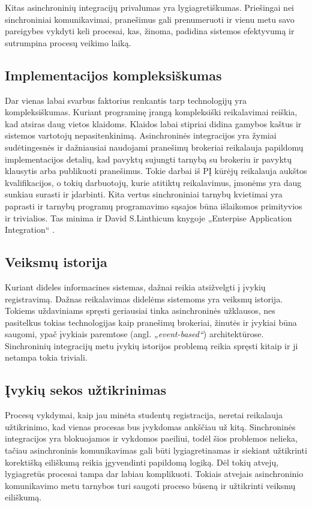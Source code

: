 Kitas asinchroninių integracijų privalumas yra lygiagretiškumas. Priešingai nei sinchroniniai komunikavimai,
pranešimus gali prenumeruoti ir vienu metu savo pareigybes vykdyti keli procesai, kas, žinoma, padidina sistemos
efektyvumą ir sutrumpina procesų veikimo laiką.

\subsection{Implementacijos kompleksiškumas}

Dar vienas labai svarbus faktorius renkantis tarp technologijų yra kompleksiškumas. Kuriant programinę įrangą kompleksiški reikalavimai
reiškia, kad atsiras daug vietos klaidoms. Klaidos labai stipriai didina gamybos kaštus ir sistemos vartotojų nepasitenkinimą.
Asinchroninės integracijos yra žymiai sudėtingesnės ir dažniausiai naudojami pranešimų brokeriai reikalauja papildomų 
implementacijos detalių, kad pavyktų sujungti tarnybą su brokeriu ir pavyktų klausytis arba publikuoti pranešimus.
Tokie darbai iš PĮ kūrėjų reikalauja aukštos kvalifikacijos, o tokių darbuotojų, kurie atitiktų reikalavimus,  įmonėms yra daug sunkiau surasti ir įdarbinti.
Kita vertus sinchroniniai tarnybų kvietimai yra paprasti ir tarnybų programų programavimo sąsajos būna išlaikomos primityvios ir trivialios.
Tas minima ir David S.Linthicum knygoje „Enterpise Application Integration“ \cite{Bk3}.

\subsection{Veiksmų istorija}

Kuriant dideles informacines sistemas, dažnai reikia atsižvelgti į įvykių registravimą. Dažnas reikalavimas didelėms sistemoms yra veiksmų istorija.
Tokiems uždaviniams spręsti geriausiai tinka asinchroninės užklausos, nes pasitelkus tokias technologijas kaip pranešimų brokeriai,
žinutės ir įvykiai būna saugomi, ypač įvykiais paremtose (angl. \textit{„event-based“}) architektūrose.
Sinchroninių integracijų metu įvykių istorijos problemą reikia spręsti kitaip ir ji netampa tokia triviali.

\subsection{Įvykių sekos užtikrinimas}

Procesų vykdymai, kaip jau minėta studentų registracija, neretai reikalauja užtikrinimo, kad vienas procesas bus įvykdomas ankščiau už kitą.
Sinchroninės integracijos yra blokuojamos ir vykdomos paeiliui, todėl šios problemos nelieka, tačiau asinchroninis komunikavimas gali būti 
lygiagretinamas ir siekiant užtikrinti korektišką eiliškumą reikia įgyvendinti papildomą logiką. Dėl tokių atvejų, lygiagretūs procesai
tampa dar labiau komplikuoti. Tokiais atvejais asinchroninio komunikavimo metu tarnybos turi saugoti proceso būseną ir užtikrinti veiksmų eiliškumą.

